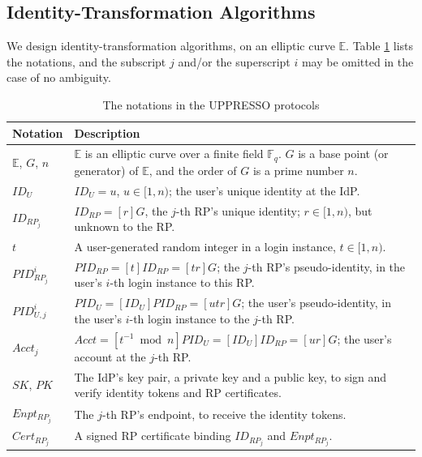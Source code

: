 
\subsection{Identity-Transformation Algorithms}
\label{subsec:overview}

We design identity-transformation algorithms,
    on an elliptic curve $\mathbb{E}$.
Table \ref{tbl:notations-protocol} lists the notations,
    and the subscript $j$ and/or the superscript $i$ may be omitted in the case of no ambiguity.

\begin{table}[tb]
\footnotesize
    \caption{The notations in the UPPRESSO protocols}
    \centering
    \begin{tabular}{|p{1.0cm}|p{6.60cm}|} \hline
    {\textbf{Notation}} & {\textbf{Description}} \\ \hline
    {$\mathbb{E}$, $G$, $n$} & {$\mathbb{E}$ is an elliptic curve over a finite field $\mathbb{F}_q$. $G$ is a base point (or generator) of $\mathbb{E}$, and the order of $G$ is a prime number $n$.} \\ \hline
    {$ID_U$} & {$ID_U = u$, $u \in [1, n)$; the user's unique identity at the IdP.} \\ \hline
   {$ID_{RP_j}$} & {$ID_{RP} = [r]G$, the $j$-th RP's unique identity; $r \in [1, n)$, but unknown to the RP.} \\ \hline
    {$t$} & {A user-generated random integer in a login instance, $t \in [1, n)$.} \\ \hline
    {$PID_{RP_j}^i$} & {$PID_{RP} = [t]{ID_{RP}} = [tr]G$; the $j$-th RP's pseudo-identity, in the user's $i$-th login instance to this RP.} \\ \hline
    {$PID_{U,j}^i$} & {$PID_U = [{ID_U}]{PID_{RP}} = [utr]G$; the user's pseudo-identity, in the user's $i$-th login instance to the $j$-th RP.} \\ \hline
     {$Acct_j$} & {$Acct = [t^{-1}\bmod n]PID_{U} = [ID_U]ID_{RP} = [ur]G$; the user's account at the $j$-th RP.} \\ \hline
    {$SK$, $PK$} & {The IdP's key pair, a private key and a public key, to sign and verify identity tokens and RP certificates.} \\ \hline
    {$Enpt_{RP_j}$} & {The $j$-th RP's endpoint, to receive the identity tokens.} \\ \hline
    {$Cert_{RP_j}$} & {A signed RP certificate binding $ID_{RP_j}$ and $Enpt_{RP_j}$.} \\ \hline
    \end{tabular}
    \label{tbl:notations-protocol}
\end{table}


